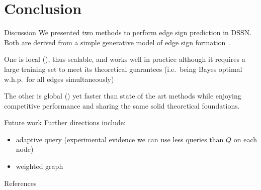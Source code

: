 \documentclass[svgnames,ignorenonframetext,final]{beamer}
\begin{document}
\section{Conclusion}\label{conclusion}

\begin{frame}{Discussion}
We presented two methods to perform edge sign prediction in DSSN. Both
are derived from a simple generative model of edge sign
formation~\autocite{trollsNIPS16}.

One is local (\usrule{}), thus scalable, and works well in practice
although it requires a large training set to meet its theoretical
guarantees (i.e.~being Bayes optimal w.h.p.~for all edges
simultaneously)

The other is global (\uslpropGsec{}) yet faster than state of the art
methods while enjoying competitive performance and sharing the same
solid theoretical foundations.

\end{frame}
\begin{frame}{Future work}
Further directions include:

\begin{itemize}
\item
  adaptive query (experimental evidence we can use less queries than
  \(Q\) on each node)
\item
  weighted graph
\end{itemize}
\end{frame}


\begin{frame}[allowframebreaks]{References}
  \printbibliography
\end{frame}
\end{document}
